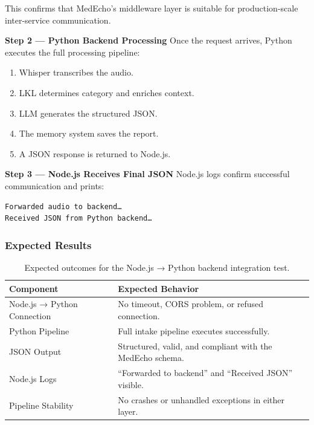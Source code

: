 This confirms that MedEcho’s middleware layer is suitable for production-scale inter-service communication.

\textbf{Step 2 — Python Backend Processing}  
Once the request arrives, Python executes the full processing pipeline:
\begin{enumerate}
    \item Whisper transcribes the audio.
    \item LKL determines category and enriches context.
    \item LLM generates the structured JSON.
    \item The memory system saves the report.
    \item A JSON response is returned to Node.js.
\end{enumerate}

\textbf{Step 3 — Node.js Receives Final JSON}  
Node.js logs confirm successful communication and prints:

\begin{verbatim}
Forwarded audio to backend…
Received JSON from Python backend…
\end{verbatim}

\subsubsection*{Expected Results}

\begin{table}[H]
\centering
\renewcommand{\arraystretch}{1.3}
\begin{tabular}{|p{4cm}|p{9cm}|}
\hline
\textbf{Component} & \textbf{Expected Behavior} \\
\hline
Node.js → Python Connection & No timeout, CORS problem, or refused connection. \\
\hline
Python Pipeline & Full intake pipeline executes successfully. \\
\hline
JSON Output & Structured, valid, and compliant with the MedEcho schema. \\
\hline
Node.js Logs & ``Forwarded to backend'' and ``Received JSON'' visible. \\
\hline
Pipeline Stability & No crashes or unhandled exceptions in either layer. \\
\hline
\end{tabular}
\caption{Expected outcomes for the Node.js → Python backend integration test.}
\label{tab:node-python-expectations}
\end{table}





